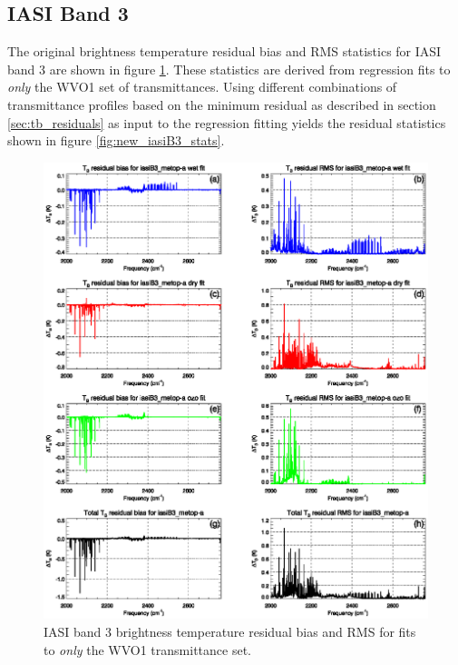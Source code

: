 \subsection{IASI Band 3}
The original brightness temperature residual bias and RMS statistics for IASI band 3 are shown in figure \ref{fig:old_iasiB3_stats}. These statistics are derived from regression fits to \emph{only} the WVO1 set of transmittances. Using different combinations of transmittance profiles based on the minimum residual as described in section \ref{sec:tb_residuals} as input to the regression fitting yields the residual statistics shown in figure \ref{fig:new_iasiB3_stats}. 
\begin{figure}[htp]
  \centering
  \includegraphics[scale=0.8]{graphics/stats/old/iasiB3_metop-a.FitStats.eps}
  \caption{IASI band 3 brightness temperature residual bias and RMS for fits to \emph{only} the WVO1 transmittance set.}
  \label{fig:old_iasiB3_stats}
\end{figure}
